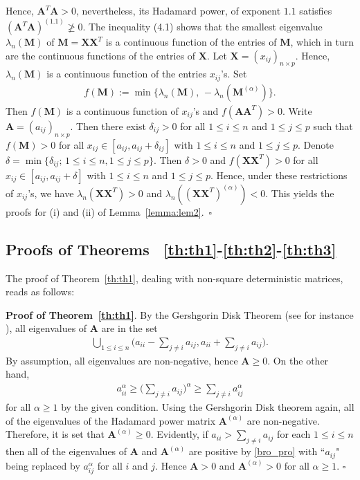 \documentclass[conference,letterpaper]{IEEEtran}
\numberwithin{equation}{section}
\newcommand{\lbl}{\label}
\newcommand{\beaa}{\begin{eqnarray*}}
\newcommand{\eeaa}{\end{eqnarray*}}
\newcommand{\bea}{\begin{eqnarray}}
\newcommand{\eea}{\end{eqnarray}}
\begin{document}
Hence, $\mathbf{A}^T\mathbf{A}>0$, nevertheless, its Hadamard power, of exponent $1.1$ satisfies $(\mathbf{A}^T\mathbf{A})^{(1.1)} \ngeqslant 0$.
The inequality (4.1) shows that the smallest eigenvalue $\lambda_n(\mathbf{M})$ of $\mathbf{M}=\mathbf{X}\mathbf{X}^T$ is a continuous function of the entries of $\mathbf{M}$, which in turn are the continuous functions of the entries of $\mathbf{X}$. 
Let $\mathbf{X}=(x_{ij})_{n\times p}$.
Hence, $\lambda_n(\mathbf{M})$ is a continuous function of the entries $x_{ij}$'s. 
Set
 \beaa
f(\mathbf{M}):=\min\big\{\lambda_n(\mathbf{M}),\, -\lambda_n(\mathbf{M}^{(\alpha)})\big\}.
\eeaa
Then $f(\mathbf{M})$ is a continuous function of $x_{ij}$'s and $f(\mathbf{A}\mathbf{A}^T)>0.$ Write  $\mathbf{A}=(a_{ij})_{n\times p}$. Then there exist $\delta_{ij}>0$ for all $1\leq i\leq n$ and $1\leq j \leq p$ such that $f(\mathbf{M})>0$ for all $x_{ij}\in [a_{ij}, a_{ij}+\delta_{ij}]$ with $1\leq i\leq n$ and $1\leq j \leq p$. Denote $\delta=\min\{\delta_{ij};\, 1\leq i\leq n, 1\leq j \leq p\}.$ Then $\delta>0$ and $f(\mathbf{X}\mathbf{X}^T)>0$ for all $x_{ij}\in [a_{ij}, a_{ij}+\delta]$ with $1\leq i\leq n$ and $1\leq j \leq p$. Hence, under these restrictions of $x_{ij}$'s, we have $\lambda_n(\mathbf{X}\mathbf{X}^T)>0$ and $\lambda_n((\mathbf{X}\mathbf{X}^T)^{(\alpha)}) < 0$. This yields the proofs for (i) and (ii) of Lemma~\ref{lemma:lem2}.~\hfill$\square$

\medskip


\subsection{Proofs of Theorems ~\ref{th:th1}-\ref{th:th2}-\ref{th:th3}}
The proof of Theorem~\ref{th:th1}, dealing with non-square deterministic matrices, reads as follows:

\noindent\textbf{Proof of Theorem~\ref{th:th1}}. 
By the Gershgorin Disk Theorem (see for instance \cite{horn1985}), all eigenvalues of $\mathbf{A}$ are in the set
\bea\lbl{bro_pro}
\bigcup_{1\leq i \leq n}\Big(a_{ii}- \sum_{j\ne i}a_{ij}, a_{ii}+ \sum_{j\ne i}a_{ij}\Big).
\eea
By assumption, all eigenvalues are non-negative, hence $\mathbf{A}\geq 0$. On the other hand,
\beaa
a_{ii}^{\alpha}\geq  \Big(\sum_{j\ne i}a_{ij}\Big)^{\alpha}\geq \sum_{j\ne i}a_{ij}^{\alpha}
\eeaa
for all $\alpha\geq 1$ by the given condition. 
Using the Gershgorin Disk theorem again, all of the eigenvalues of the Hadamard power matrix $\mathbf{A}^{(\alpha)}$ are non-negative. 
Therefore,  it is set that $\mathbf{A}^{(\alpha)}\geq  0$.
Evidently, if $a_{ii}>  \sum_{j\ne i}a_{ij}$ for each $1\leq i\leq n$ then all of the eigenvalues of  $\mathbf{A}$  and $\mathbf{A}^{(\alpha)}$ are positive by \eqref{bro_pro} with ``$a_{ij}$" being replaced by $a_{ij}^{\alpha}$ for all $i$ and $j$. Hence $\mathbf{A} > 0$ and $\mathbf{A}^{(\alpha)}> 0$ for all $\alpha\geq 1.$ \hfill$\square$
\medskip
\end{document}
